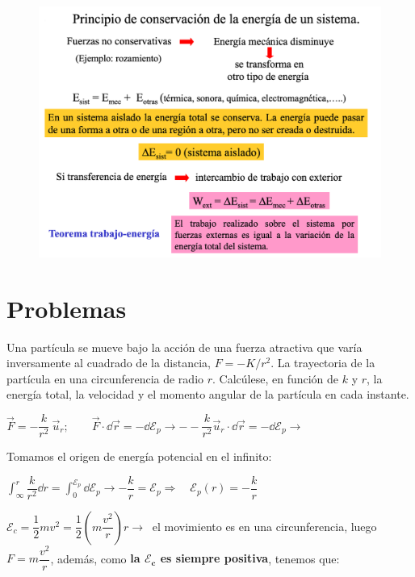 \begin{figure}[H]
	\centering
	\includegraphics[width=1\textwidth]{imagenes/imagenes04/T04IM11.png}
\end{figure}


\section{Problemas}

\begin{prob}
Una partícula se mueve bajo la acción de una fuerza atractiva que varía inversamente al cuadrado de la distancia, $F=-K/r^2$. La trayectoria de la partícula en una circunferencia de radio $r$. Calcúlese, en función de $k$ y $r$, la energía total, la velocidad y el momento angular de la partícula en cada instante.	
\end{prob}

$\vec F=-\dfrac k {r^2}\ \vec u_r ; \qquad \vec F \cdot \dd \vec r=-\dd \mathcal E_p \to --\dfrac k {r^2} \vec u_r \cdot \dd \vec r=-\dd \mathcal E_p \to$

Tomamos el origen de energía potencial en el infinito:

$\displaystyle \int_{\infty}^r \dfrac k {r^2} \dd r = \int_0^{\mathcal E_p} \dd \mathcal E_p \to -\dfrac k r =\mathcal E_p \Rightarrow \quad \mathcal E_p(r)=-\dfrac k r$


$\mathcal E_c=\dfrac 1 2 m v^2=\dfrac 1 2  \left( m \dfrac {v^2} r \right)  r \to \ $ el movimiento es en una circunferencia, luego $F=m\dfrac {v^2}r$, además, como \textbf{la $\boldsymbol{\mathcal E_c}$ es siempre positiva}, tenemos que:

